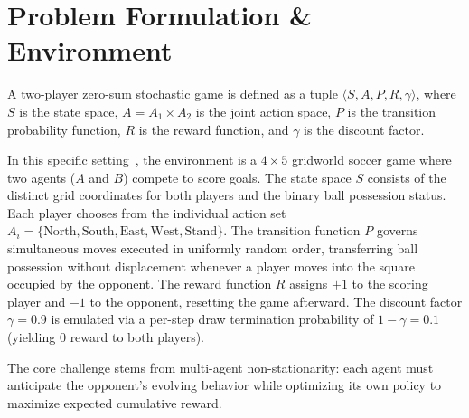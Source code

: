 \section{Problem Formulation \& Environment}
A two-player zero-sum stochastic game is defined as a tuple $\langle S, A, P, R, \gamma \rangle$, where $S$ is the state space, $A = A_1 \times A_2$ is the joint action space, $P$ is the transition probability function, $R$ is the reward function, and $\gamma$ is the discount factor.

In this specific setting~\cite{littman1994markov}, the environment is a $4 \times 5$ gridworld soccer game where two agents ($A$ and $B$) compete to score goals. The state space $S$ consists of the distinct grid coordinates for both players and the binary ball possession status. Each player chooses from the individual action set $A_i = \{\text{North}, \text{South}, \text{East}, \text{West}, \text{Stand}\}$. The transition function $P$ governs simultaneous moves executed in uniformly random order, transferring ball possession without displacement whenever a player moves into the square occupied by the opponent. The reward function $R$ assigns $+1$ to the scoring player and $-1$ to the opponent, resetting the game afterward. The discount factor $\gamma = 0.9$ is emulated via a per-step draw termination probability of $1 - \gamma = 0.1$ (yielding $0$ reward to both players).

The core challenge stems from multi-agent non-stationarity: each agent must anticipate the opponent's evolving behavior while optimizing its own policy to maximize expected cumulative reward.
